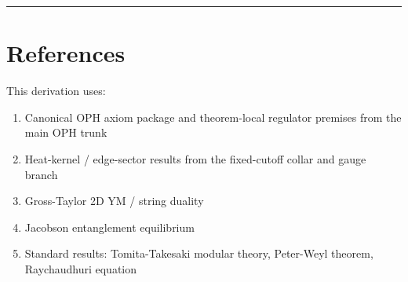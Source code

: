 \begin{center}\rule{0.5\linewidth}{0.5pt}\end{center}

\section{References}\label{references-string-theory}

This derivation uses:

\begin{enumerate}
\def\labelenumi{\arabic{enumi}.}
\tightlist
\item
  Canonical OPH axiom package and theorem-local regulator premises from the main OPH trunk
\item
  Heat-kernel / edge-sector results from the fixed-cutoff collar and gauge branch
\item
  Gross-Taylor 2D YM / string duality~\cite{grossTaylor93}
\item
  Jacobson entanglement equilibrium~\cite{jacobson95,jacobson16}
\item
  Standard results: Tomita-Takesaki modular theory, Peter-Weyl theorem, Raychaudhuri equation
\end{enumerate}
